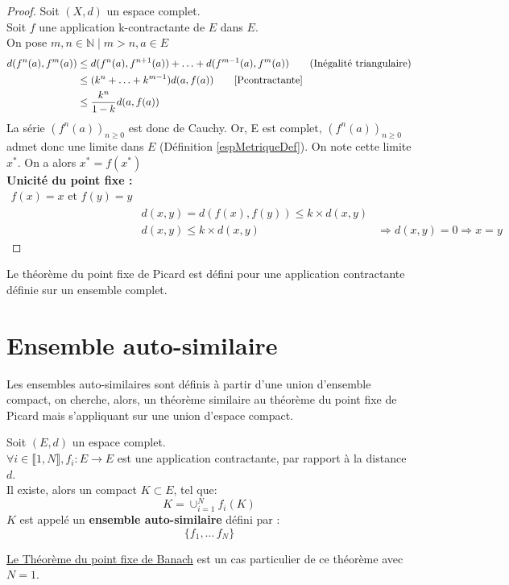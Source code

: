 \documentclass[a4paper, 12pt]{report}
\begin{document}
			\begin{proof}
				Soit $(X,d)$ un espace complet.\\
				Soit $f$ une application k-contractante de $E$ dans $E$.\\
				On pose $m,n\in\mathds{N}\mid m>n,a\in E$\\
				\begin{align*}
					d(f^n(a),f^m(a))&\leq d(f^n(a),f^{n+1}(a))+\ldots+d(f^{m-1}(a),f^m(a))  \tag{Inégalité triangulaire}\\
									&\leq (k^n+\ldots+k^{m-1})d(a,f(a)) \tag*{\eqref{Pcontractante}}\\
									&\leq \frac{k^n}{1-k}d(a,f(a))
				\end{align*}
				La série $(f^n(a))_{n\geq 0}$ est donc de Cauchy. Or, E est complet, $(f^n(a))_{n\geq 0}$ admet donc une limite dans $E$ (Définition \ref{espMetriqueDef}). On note cette limite $x^*$.
				On a alors $x^*=f(x^*)$\\
				\textbf{Unicité du point fixe :}
				\begin{align*}
					f(x)=x \textrm{ et } f(y)=y\\
					&d(x,y) = d(f(x),f(y)) \leq k\times d(x,y)\\
					&d(x,y) \leq k\times d(x,y)
					&\Rightarrow d(x,y)=0\Rightarrow x=y \tag{Unicité}
				\end{align*}
			\end{proof}
			\hspace{.7 cm} Le théorème du point fixe de Picard est défini pour une application contractante définie sur un ensemble complet.
\newpage
		\section{Ensemble auto-similaire}
			Les ensembles auto-similaires sont définis à partir d'une union d'ensemble compact, on cherche, alors, un théorème similaire au théorème du point fixe de Picard mais s'appliquant sur une union d'espace compact.
			\begin{theorem}
			\label{thmPrincipale}
				Soit $(E,d)$ un espace complet.\\
				$\forall i \in \llbracket 1,N \rrbracket, f_i:E \longrightarrow E$ est une application contractante, par rapport à la distance $d$.\\
				Il existe, alors un compact $K\subset E$, tel que:
				\begin{equation*}
					K=\cup^N_{i=1}f_i(K)
				\end{equation*}
				$K$ est appelé un \textbf{ensemble auto-similaire} défini par :
				\begin{equation*}
					\{f_1,\ldots\,f_N\}
				\end{equation*}
			\end{theorem}
			\begin{remark*}
			\hyperref[ThmPtFixe]{Le Théorème du point fixe de Banach} est un cas particulier de ce théorème avec $N=1$.
			\end{remark*}
		
\end{document}
